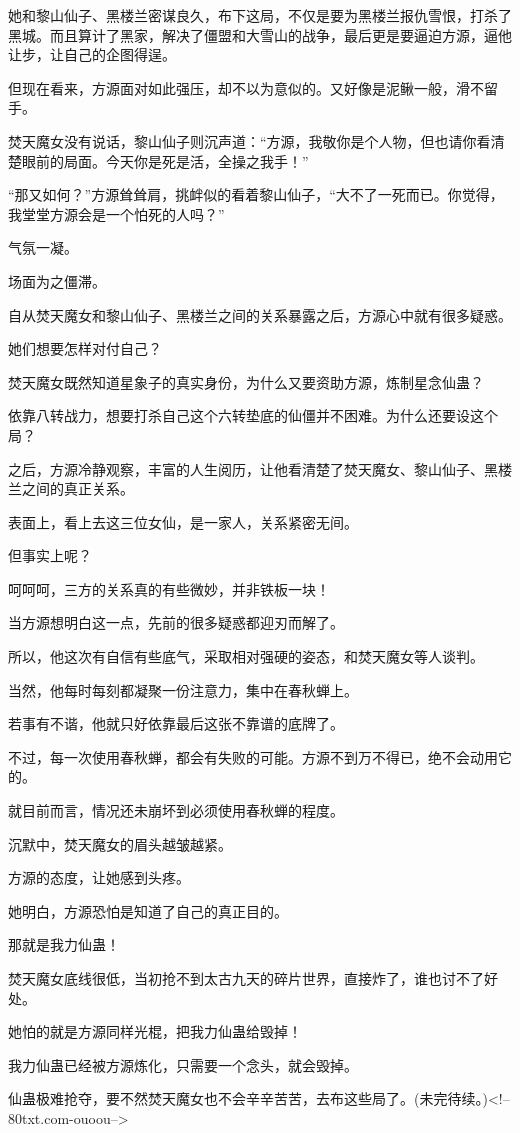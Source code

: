 \begin{this_body}
她和黎山仙子、黑楼兰密谋良久，布下这局，不仅是要为黑楼兰报仇雪恨，打杀了黑城。而且算计了黑家，解决了僵盟和大雪山的战争，最后更是要逼迫方源，逼他让步，让自己的企图得逞。

但现在看来，方源面对如此强压，却不以为意似的。又好像是泥鳅一般，滑不留手。

焚天魔女没有说话，黎山仙子则沉声道：“方源，我敬你是个人物，但也请你看清楚眼前的局面。今天你是死是活，全操之我手！”

“那又如何？”方源耸耸肩，挑衅似的看着黎山仙子，“大不了一死而已。你觉得，我堂堂方源会是一个怕死的人吗？”

气氛一凝。

场面为之僵滞。

自从焚天魔女和黎山仙子、黑楼兰之间的关系暴露之后，方源心中就有很多疑惑。

她们想要怎样对付自己？

焚天魔女既然知道星象子的真实身份，为什么又要资助方源，炼制星念仙蛊？

依靠八转战力，想要打杀自己这个六转垫底的仙僵并不困难。为什么还要设这个局？

之后，方源冷静观察，丰富的人生阅历，让他看清楚了焚天魔女、黎山仙子、黑楼兰之间的真正关系。

表面上，看上去这三位女仙，是一家人，关系紧密无间。

但事实上呢？

呵呵呵，三方的关系真的有些微妙，并非铁板一块！

当方源想明白这一点，先前的很多疑惑都迎刃而解了。

所以，他这次有自信有些底气，采取相对强硬的姿态，和焚天魔女等人谈判。

当然，他每时每刻都凝聚一份注意力，集中在春秋蝉上。

若事有不谐，他就只好依靠最后这张不靠谱的底牌了。

不过，每一次使用春秋蝉，都会有失败的可能。方源不到万不得已，绝不会动用它的。

就目前而言，情况还未崩坏到必须使用春秋蝉的程度。

沉默中，焚天魔女的眉头越皱越紧。

方源的态度，让她感到头疼。

她明白，方源恐怕是知道了自己的真正目的。

那就是我力仙蛊！

焚天魔女底线很低，当初抢不到太古九天的碎片世界，直接炸了，谁也讨不了好处。

她怕的就是方源同样光棍，把我力仙蛊给毁掉！

我力仙蛊已经被方源炼化，只需要一个念头，就会毁掉。

仙蛊极难抢夺，要不然焚天魔女也不会辛辛苦苦，去布这些局了。(未完待续。)<!--80txt.com-ouoou-->

\end{this_body}

